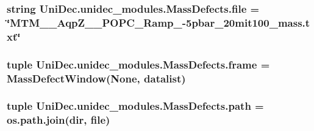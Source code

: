 \subsubsection[{file}]{\setlength{\rightskip}{0pt plus 5cm}string Uni\+Dec.\+unidec\+\_\+modules.\+Mass\+Defects.\+file = \char`\"{}M\+T\+M\+\_\+\_\+\+Aqp\+Z\+\_\+\_\+\+P\+O\+P\+C\+\_\+\+Ramp\+\_-\/5pbar\+\_\+20mit100\+\_\+mass.\+txt\char`\"{}}\label{namespace_uni_dec_1_1unidec__modules_1_1_mass_defects_a425742773f2151e1357cd0de46d2727f}
\hypertarget{namespace_uni_dec_1_1unidec__modules_1_1_mass_defects_a4501d304a3583a083e16a2fb6b896780}{}
\subsubsection[{frame}]{\setlength{\rightskip}{0pt plus 5cm}tuple Uni\+Dec.\+unidec\+\_\+modules.\+Mass\+Defects.\+frame = {\bf Mass\+Defect\+Window}(None, {\bf datalist})}\label{namespace_uni_dec_1_1unidec__modules_1_1_mass_defects_a4501d304a3583a083e16a2fb6b896780}
\hypertarget{namespace_uni_dec_1_1unidec__modules_1_1_mass_defects_aff5fe5c86f53ebe5a7a30e769d771df6}{}
\subsubsection[{path}]{\setlength{\rightskip}{0pt plus 5cm}tuple Uni\+Dec.\+unidec\+\_\+modules.\+Mass\+Defects.\+path = os.\+path.\+join({\bf dir}, {\bf file})}\label{namespace_uni_dec_1_1unidec__modules_1_1_mass_defects_aff5fe5c86f53ebe5a7a30e769d771df6}
